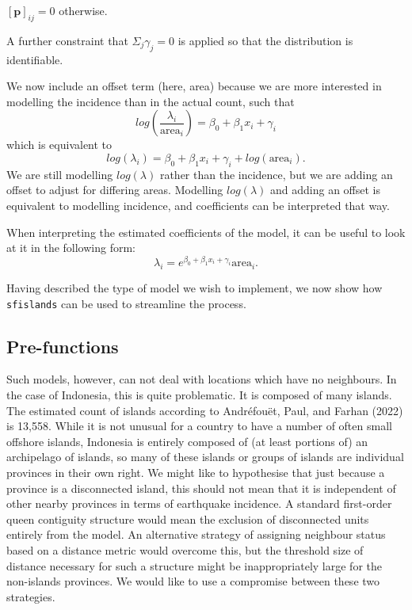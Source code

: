 \([\textbf{p}]_{ij} = 0\) otherwise.

A further constraint that \(\Sigma_j \gamma_j = 0\) is applied so that the
distribution is identifiable.

We now include an offset term (here, area) because we are more interested
in modelling the incidence than in the actual count, such that
\begin{equation}
log(\frac{\lambda_i} {\text{area}_i}) = \beta_0 + \beta_1x_i + \gamma_i
\label{eq:eq6}
\end{equation}
which is equivalent to
\begin{equation}
log(\lambda_i) = \beta_0 + \beta_1x_i + \gamma_i + log(\text{area}_i).
\label{eq:eq7}
\end{equation}
We are still modelling \(log(\lambda)\) rather than the incidence, but we
are adding an offset to adjust for differing areas. Modelling \(log(\lambda)\) and adding an offset is equivalent to
modelling incidence, and coefficients can be interpreted that way.

When interpreting the estimated coefficients of the model, it can be
useful to look at it in the following form:
\begin{equation}
\lambda_i = e^{\beta_0 + \beta_1 x_i + \gamma_i} \text{area}_i.
\label{eq:eq8}
\end{equation}

Having described the type of model we wish to implement, we now show how \texttt{sfislands} can be used to streamline the process.

\hypertarget{pre-functions-1}{%
\subsection{Pre-functions}\label{pre-functions-1}}

Such models, however, can not deal with locations which have no
neighbours. In the case of Indonesia, this is quite problematic. It is
composed of many islands. The estimated count of
islands according to Andréfouët, Paul, and Farhan (2022) is 13,558.
While it is not unusual for a country to have a number of often small
offshore islands, Indonesia is entirely composed of (at least portions
of) an archipelago of islands, so many of these islands or groups of
islands are individual provinces in their own right. We might like to hypothesise that just because a province is a disconnected island, this should not mean that it is independent of other nearby provinces in terms of earthquake incidence. A standard first-order queen contiguity structure would mean the exclusion of disconnected units entirely from the model. An alternative strategy of assigning neighbour status based on a distance metric would overcome this, but the threshold size of distance necessary for such a structure might be inappropriately large for the non-islands provinces. We would like to use a compromise between these two strategies.

